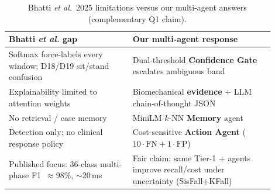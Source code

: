 \begin{table}[!t]
\centering
\caption{Bhatti \textit{et al.}~2025 limitations versus our multi-agent answers (complementary Q1 claim).}
\label{tab:bhattigaps}
\begin{tabular}{p{0.42\linewidth}p{0.48\linewidth}}
\toprule
Bhatti \textit{et al.} gap & Our multi-agent response \\
\midrule
Softmax force-labels every window; D18/D19 sit/stand confusion & Dual-threshold \textbf{Confidence Gate} escalates ambiguous band \\
Explainability limited to attention weights & Biomechanical \textbf{evidence} + LLM chain-of-thought JSON \\
No retrieval / case memory & MiniLM $k$-NN \textbf{Memory} agent \\
Detection only; no clinical response policy & Cost-sensitive \textbf{Action Agent} ($10\cdot\mathrm{FN}+1\cdot\mathrm{FP}$) \\
Published focus: 36-class multi-phase F1~$\approx$98\%, $\sim$20\,ms & Fair claim: same Tier-1 + agents improve recall/cost under uncertainty (SisFall+KFall) \\
\bottomrule
\end{tabular}
\end{table}
